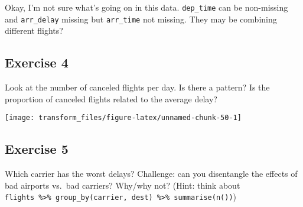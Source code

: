 \documentclass[]{book}
\newenvironment{Shaded}{\begin{snugshade}}{\end{snugshade}}
\newcommand{\CommentTok}[1]{\textcolor[rgb]{0.56,0.35,0.01}{\textit{#1}}}
\newcommand{\DataTypeTok}[1]{\textcolor[rgb]{0.13,0.29,0.53}{#1}}
\newcommand{\KeywordTok}[1]{\textcolor[rgb]{0.13,0.29,0.53}{\textbf{#1}}}
\newcommand{\NormalTok}[1]{#1}
\newcommand{\OperatorTok}[1]{\textcolor[rgb]{0.81,0.36,0.00}{\textbf{#1}}}
\newcommand{\OtherTok}[1]{\textcolor[rgb]{0.56,0.35,0.01}{#1}}
\newcommand{\StringTok}[1]{\textcolor[rgb]{0.31,0.60,0.02}{#1}}
\theoremstyle{plain}
\theoremstyle{remark}
\theoremstyle{definition}
\theoremstyle{definition}
\theoremstyle{definition}
\theoremstyle{remark}
\begin{document}
Okay, I'm not sure what's going on in this data. \texttt{dep\_time} can
be non-missing and \texttt{arr\_delay} missing but \texttt{arr\_time}
not missing. They may be combining different flights?

\hypertarget{exercise-4-7}{%
\subsection{Exercise 4}\label{exercise-4-7}}

Look at the number of canceled flights per day. Is there a pattern? Is
the proportion of canceled flights related to the average delay?

\begin{Shaded}
\end{Shaded}

\begin{center}\texttt{[image: transform\_files/figure-latex/unnamed-chunk-50-1]} \end{center}

\hypertarget{exercise-5-4}{%
\subsection{Exercise 5}\label{exercise-5-4}}

Which carrier has the worst delays? Challenge: can you disentangle the
effects of bad airports vs.~bad carriers? Why/why not? (Hint: think
about
\texttt{flights\ \%\textgreater{}\%\ group\_by(carrier,\ dest)\ \%\textgreater{}\%\ summarise(n())})
\end{document}
